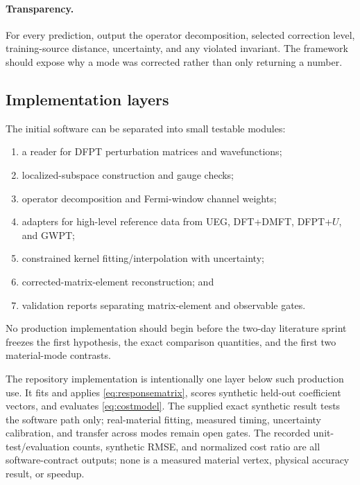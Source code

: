 \paragraph{Transparency.}
For every prediction, output the operator decomposition, selected correction
level, training-source distance, uncertainty, and any violated invariant.  The
framework should expose why a mode was corrected rather than only returning a
number.

\subsection{Implementation layers}

The initial software can be separated into small testable modules:

\begin{enumerate}
  \item a reader for DFPT perturbation matrices and wavefunctions;
  \item localized-subspace construction and gauge checks;
  \item operator decomposition and Fermi-window channel weights;
  \item adapters for high-level reference data from UEG, DFT+DMFT, DFPT+$U$, and
  GWPT;
  \item constrained kernel fitting/interpolation with uncertainty;
  \item corrected-matrix-element reconstruction; and
  \item validation reports separating matrix-element and observable gates.
\end{enumerate}

No production implementation should begin before the two-day literature sprint
freezes the first hypothesis, the exact comparison quantities, and the first two
material-mode contrasts.

The repository implementation is intentionally one layer below such production
use.  It fits and applies \cref{eq:responsematrix}, scores synthetic held-out
coefficient vectors, and evaluates \cref{eq:costmodel}.  The supplied exact
synthetic result tests the software path only; real-material fitting, measured
timing, uncertainty calibration, and transfer across modes remain open gates.
The recorded unit-test/evaluation counts, synthetic RMSE, and normalized cost
ratio are all software-contract outputs; none is a measured material vertex,
physical accuracy result, or speedup.
